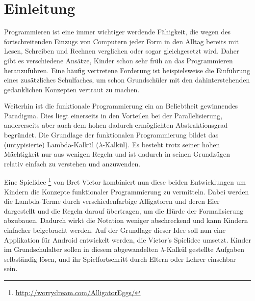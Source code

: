 \section{Einleitung}

Programmieren ist eine immer wichtiger werdende Fähigkeit, die wegen des fortschreitenden Einzugs von Computern jeder Form in den Alltag bereits mit Lesen, Schreiben und Rechnen verglichen oder sogar gleichgesetzt wird.
Daher gibt es verschiedene Ansätze, Kinder schon sehr früh an das Programmieren heranzuführen.
Eine häufig vertretene Forderung ist beispielsweise die Einführung eines zusätzliches Schulfaches, um schon Grundschüler mit den dahinterstehenden gedanklichen Konzepten vertraut zu machen.

Weiterhin ist die funktionale Programmierung ein an Beliebtheit gewinnendes Paradigma.
Dies liegt einerseits in den Vorteilen bei der Parallelisierung, andererseits aber auch dem hohen dadurch ermöglichten Abstraktionsgrad begründet.
Die Grundlage der funktionalen Programmierung bildet das (untypisierte) Lambda-Kalkül (\(\lambda\)-Kalkül).
Es besteht trotz seiner hohen Mächtigkeit nur aus wenigen Regeln und ist dadurch in seinen Grundzügen relativ einfach zu verstehen und anzuwenden.

Eine Spielidee \footnote{\url{http://worrydream.com/AlligatorEggs/}} von Bret Victor kombiniert nun diese beiden Entwicklungen um Kindern die Konzepte funktionaler Programmierung zu vermitteln.
Dabei werden die Lambda-Terme durch verschiedenfarbige Alligatoren und deren Eier dargestellt und die Regeln darauf übertragen, um die Hürde der Formalisierung abzubauen.
Dadurch wirkt die Notation weniger abschreckend und kann Kindern einfacher beigebracht werden.
Auf der Grundlage dieser Idee soll nun eine Applikation für Android entwickelt werden, die Victor's Spielidee umsetzt.
Kinder im Grundschulalter sollen in diesem abgewandelten \(\lambda\)-Kalkül gestellte Aufgaben selbständig lösen, und ihr Spielfortschritt durch Eltern oder Lehrer einsehbar sein.
